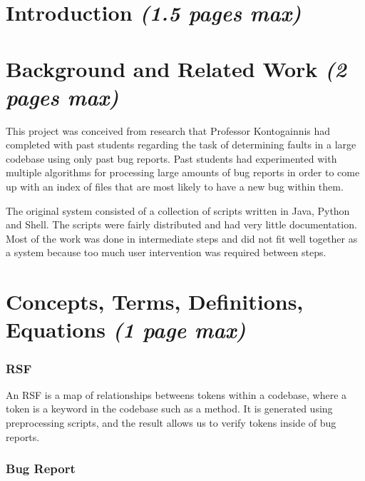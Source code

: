 \documentclass[12pt]{article}
\begin{document}
\hypertarget{introduction-1.5-pages-max}{%
\section{\texorpdfstring{Introduction \emph{(1.5 pages
max)}}{Introduction (1.5 pages max)}}\label{introduction-1.5-pages-max}}

\hypertarget{background-and-related-work-2-pages-max}{%
\section{\texorpdfstring{Background and Related Work \emph{(2 pages
max)}}{Background and Related Work (2 pages max)}}\label{background-and-related-work-2-pages-max}}

This project was conceived from research that Professor Kontogainnis had
completed with past students regarding the task of determining faults in
a large codebase using only past bug reports. Past students had
experimented with multiple algorithms for processing large amounts of
bug reports in order to come up with an index of files that are most
likely to have a new bug within them.

The original system consisted of a collection of scripts written in
Java, Python and Shell. The scripts were fairly distributed and had very
little documentation. Most of the work was done in intermediate steps
and did not fit well together as a system because too much user
intervention was required between steps.

\hypertarget{concepts-terms-definitions-equations-1-page-max}{%
\section{\texorpdfstring{Concepts, Terms, Definitions, Equations
\emph{(1 page
max)}}{Concepts, Terms, Definitions, Equations (1 page max)}}\label{concepts-terms-definitions-equations-1-page-max}}

\hypertarget{rsf}{%
\subsubsection{RSF}\label{rsf}}

An RSF is a map of relationships betweens tokens within a codebase,
where a token is a keyword in the codebase such as a method. It is
generated using preprocessing scripts, and the result allows us to
verify tokens inside of bug reports.

\hypertarget{bug-report}{%
\subsubsection{Bug Report}\label{bug-report}}
\end{document}
